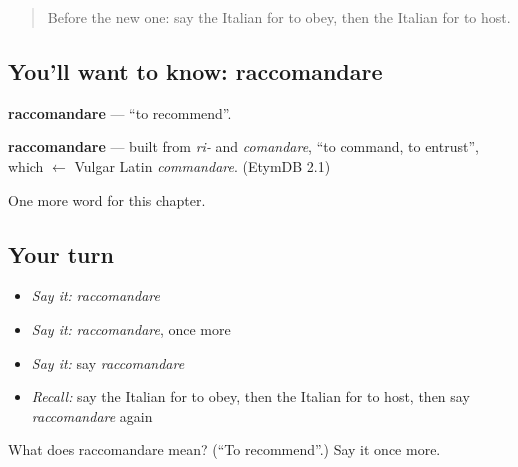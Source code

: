 \label{lesson:IT-C213-raccomandare}



\begin{quote}
Before the new one: say the Italian for to obey, then the Italian for to host.
\end{quote}

\subsection*{You'll want to know: raccomandare}
\textbf{raccomandare} — \textquotedblleft{}to recommend\textquotedblright{}.

\begin{cousinweb}
\textbf{raccomandare} — built from \emph{ri-} and \emph{comandare}, \textquotedblleft{}to command, to entrust\textquotedblright{}, which $\leftarrow$ Vulgar Latin \emph{commandare}. (EtymDB 2.1)
\end{cousinweb}

\begin{grammarlens}[title={What you've built}]
One more word for this chapter.
\end{grammarlens}

\subsection*{Your turn}
\begin{itemize}
\raggedright
  \item \emph{Say it:} \emph{raccomandare}
  \item \emph{Say it:} \emph{raccomandare}, once more
  \item \emph{Say it:} say \emph{raccomandare}
  \item \emph{Recall:} say the Italian for to obey, then the Italian for to host, then say \emph{raccomandare} again
\end{itemize}

\begin{tcolorbox}[breakable,colback=teal!4,colframe=teal!35!black,title={Before you move on}]
What does raccomandare mean? (\textquotedblleft{}To recommend\textquotedblright{}.) Say it once more.
\end{tcolorbox}
